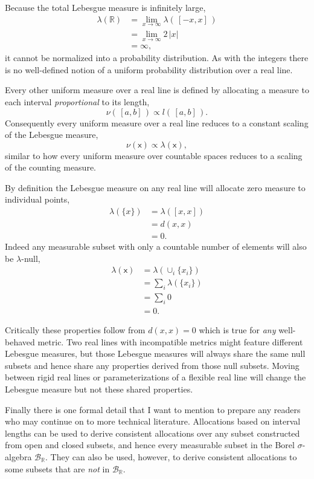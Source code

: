 \documentclass[
  letterpaper,
  DIV=11,
  numbers=noendperiod]{scrartcl}
\begin{document}
Because the total Lebesgue measure is infinitely large, \begin{align*}
\lambda(\mathbb{R})
&=
\lim_{x \rightarrow \infty} \lambda( \, [-x, x] \, )
\\
&=
\lim_{x \rightarrow \infty} 2 \, | x |
\\
&=
\infty,
\end{align*} it cannot be normalized into a probability distribution. As
with the integers there is no well-defined notion of a uniform
probability distribution over a real line.

Every other uniform measure over a real line is defined by allocating a
measure to each interval \emph{proportional} to its length, \[
\nu( \, [a, b] \, ) \propto l( \, [a, b] \, ).
\] Consequently every uniform measure over a real line reduces to a
constant scaling of the Lebesgue measure, \[
\nu ( \mathsf{x} ) \propto \lambda ( \mathsf{x} ),
\] similar to how every uniform measure over countable spaces reduces to
a scaling of the counting measure.

By definition the Lebesgue measure on any real line will allocate zero
measure to individual points, \begin{align*}
\lambda(\{ x \})
&= \lambda([x, x])
\\
&= d(x, x)
\\
&= 0.
\end{align*} Indeed any measurable subset with only a countable number
of elements will also be \(\lambda\)-null, \begin{align*}
\lambda(\mathsf{x})
&=
\lambda(\cup_{i} \{ x_{i} \} )
\\
&=
\sum_{i} \lambda( \{ x_{i} \} )
\\
&=
\sum_{i} 0
\\
&=
0.
\end{align*}

Critically these properties follow from \(d(x, x) = 0\) which is true
for \emph{any} well-behaved metric. Two real lines with incompatible
metrics might feature different Lebesgue measures, but those Lebesgue
measures will always share the same null subsets and hence share any
properties derived from those null subsets. Moving between rigid real
lines or parameterizations of a flexible real line will change the
Lebesgue measure but not these shared properties.

Finally there is one formal detail that I want to mention to prepare any
readers who may continue on to more technical literature. Allocations
based on interval lengths can be used to derive consistent allocations
over any subset constructed from open and closed subsets, and hence
every measurable subset in the Borel \(\sigma\)-algebra
\(\mathcal{B}_{\mathbb{R}}\). They can also be used, however, to derive
consistent allocations to some subsets that are \emph{not} in
\(\mathcal{B}_{\mathbb{R}}\).
\end{document}
